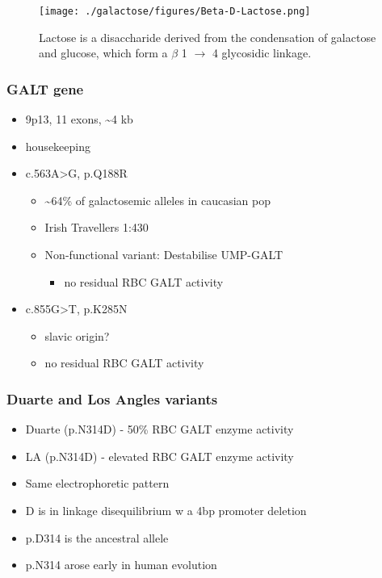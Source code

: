 \documentclass{scrartcl}
\begin{document}
\begin{figure}[htbp]
\centering
\texttt{[image: ./galactose/figures/Beta-D-Lactose.png]}
\caption[lactose]{\label{fig:orga31d5e0}
Lactose is a disaccharide derived from the condensation of galactose and glucose, which form a \(\beta\) 1 \(\to\) 4 glycosidic linkage.}
\end{figure}

\subsubsection{GALT gene}
\label{sec:orga26a376}
\begin{itemize}
\item 9p13, 11 exons, \textasciitilde{}4 kb
\item housekeeping
\item c.563A>G, p.Q188R
\begin{itemize}
\item \textasciitilde{}64\% of galactosemic alleles in caucasian pop
\item Irish Travellers 1:430
\item Non-functional variant: Destabilise UMP-GALT
\begin{itemize}
\item no residual RBC GALT activity
\end{itemize}
\end{itemize}
\item c.855G>T, p.K285N
\begin{itemize}
\item slavic origin?
\item no residual RBC GALT activity
\end{itemize}
\end{itemize}

\subsubsection{Duarte and Los Angles variants}
\label{sec:org1cef723}
\begin{itemize}
\item Duarte (p.N314D) - 50\% RBC GALT enzyme activity
\item LA (p.N314D) - elevated RBC GALT enzyme activity
\item Same electrophoretic pattern
\item D is in linkage disequilibrium w a 4bp promoter deletion
\item p.D314 is the ancestral allele
\item p.N314 arose early in human evolution
\end{itemize}
\end{document}
